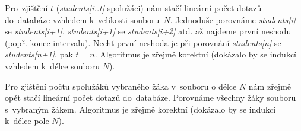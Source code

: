 \documentclass[12pt]{article}
\newcommand{\var}[1]{\textit{#1}}
\begin{document}
\noindent
Pro~zjištění $t$ (\var{students[i..t]} spolužáci) nám stačí lineární počet
dotazů do~databáze vzhledem k~velikosti souboru~$N$. Jednoduše porovnáme
\var{students[i]} se \var{students[i+1]}, \var{students[i+1]} se
\var{students[i+2]} atd. až najdeme
první neshodu (popř. konec intervalu). Nechť první neshoda je při porovnání
\var{students[n]} se \var{students[n+1]},
pak $t=n$. Algoritmus je zřejmě korektní (dokázalo by se indukcí vzhledem
k~délce souboru $N$).

\noindent
Pro zjištění počtu spolužáků vybraného žáka v~souboru o délce $N$ nám zřejmě
opět stačí lineární počet dotazů do~databáze. Porovnáme všechny žáky souboru s~vybraným
žákem. Algoritmus je zřejmě korektní (dokázalo by se indukcí k~délce pole $N$).


\end{document}
